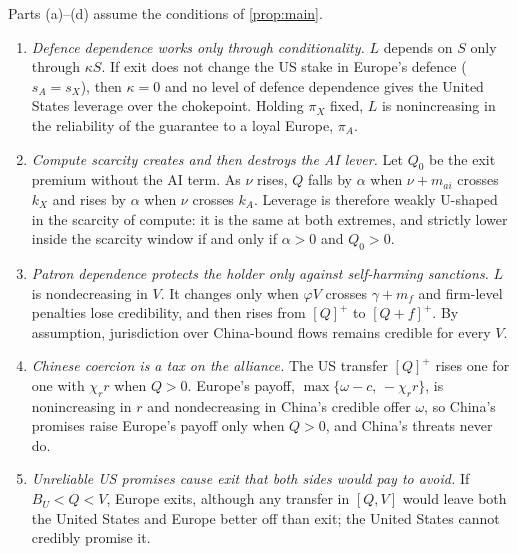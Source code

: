 \begin{corollary}\label{prop:statics}
Parts (a)--(d) assume the conditions of \cref{prop:main}.
\begin{enumerate}[label=(\alph*)]
\item \emph{Defence dependence works only through conditionality.} $L$ depends on $S$ only through $\kappa S$. If exit does not change the US stake in Europe's defence ($s_A=s_X$), then $\kappa=0$ and no level of defence dependence gives the United States leverage over the chokepoint. Holding $\pi_X$ fixed, $L$ is nonincreasing in the reliability of the guarantee to a loyal Europe, $\pi_A$.
\item \emph{Compute scarcity creates and then destroys the AI lever.} Let $Q_0$ be the exit premium without the AI term. As $\nu$ rises, $Q$ falls by $\alpha$ when $\nu + m_{ai}$ crosses $k_X$ and rises by $\alpha$ when $\nu$ crosses $k_A$. Leverage is therefore weakly U-shaped in the scarcity of compute: it is the same at both extremes, and strictly lower inside the scarcity window if and only if $\alpha>0$ and $Q_0>0$.
\item \emph{Patron dependence protects the holder only against self-harming sanctions.} $L$ is nondecreasing in $V$. It changes only when $\varphi V$ crosses $\gamma + m_f$ and firm-level penalties lose credibility, and then rises from $[Q]^+$ to $[Q+f]^+$. By assumption, jurisdiction over China-bound flows remains credible for every $V$.
\item \emph{Chinese coercion is a tax on the alliance.} The US transfer $[Q]^+$ rises one for one with $\chi_r r$ when $Q>0$. Europe's payoff, $\max\{\omega - c,\, -\chi_r r\}$, is nonincreasing in $r$ and nondecreasing in China's credible offer $\omega$, so China's promises raise Europe's payoff only when $Q>0$, and China's threats never do.
\item \emph{Unreliable US promises cause exit that both sides would pay to avoid.} If $B_U < Q < V$, Europe exits, although any transfer in $[Q,V]$ would leave both the United States and Europe better off than exit; the United States cannot credibly promise it.
\end{enumerate}
\end{corollary}

